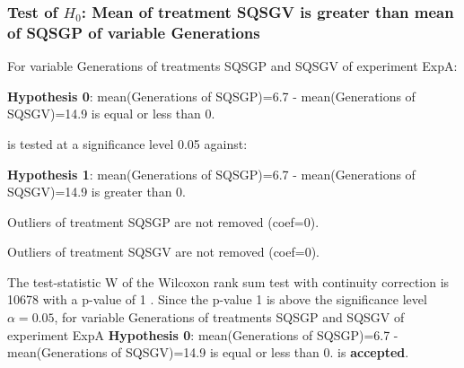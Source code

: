 \begin{frame}[t]
 \frametitle{Test of $H_{0}$: Mean of treatment SQSGV is greater than mean of SQSGP of variable Generations }
 \scriptsize
 For variable Generations of treatments SQSGP and SQSGV of experiment ExpA:

\vspace{1mm}
{\bf Hypothesis 0}: mean(Generations of SQSGP)=6.7 - mean(Generations of SQSGV)=14.9 is equal or less than 0.


 \begin{center} is tested at a significance level 0.05 against: \end{center}

{\bf Hypothesis 1}: mean(Generations of SQSGP)=6.7 - mean(Generations of SQSGV)=14.9 is greater than 0.
\vspace{1mm}
\vspace{1mm}

 Outliers of treatment SQSGP  are not removed (coef=0).

 Outliers of treatment SQSGV  are not removed (coef=0).
\vspace{1mm}
 
 The test-statistic W of the Wilcoxon rank sum test with continuity correction is 10678 with a p-value of 1 .
 Since the p-value 1 is above the significance level $\alpha= 0.05 $,
 for variable Generations of treatments SQSGP and SQSGV of experiment ExpA 
 {\bf Hypothesis 0}: mean(Generations of SQSGP)=6.7 - mean(Generations of SQSGV)=14.9 is equal or less than 0.
is {\bf accepted}.

 \end{frame}
